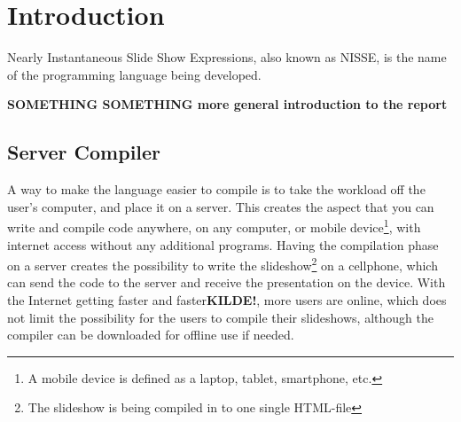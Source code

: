 \chapter{Introduction}
Nearly Instantaneous Slide Show Expressions, also known as NISSE, is the name of the programming language being developed.

\textbf{SOMETHING SOMETHING more general introduction to the report}

\section{Server Compiler}
A way to make the language easier to compile is to take the workload off the user's computer, and place it on a server. This creates the aspect that you can write and compile code anywhere, on any computer, or mobile device\footnote{A mobile device is defined as a laptop, tablet, smartphone, etc.}, with internet access without any additional programs.
Having the compilation phase on a server creates the possibility to write the slideshow\footnote{The slideshow is being compiled in to one single HTML-file} on a cellphone, which can send the code to the server and receive the presentation on the device.
With the Internet getting faster and faster\textbf{KILDE!}, more users are online, which does not limit the possibility for the users to compile their slideshows, although the compiler can be downloaded for offline use if needed.